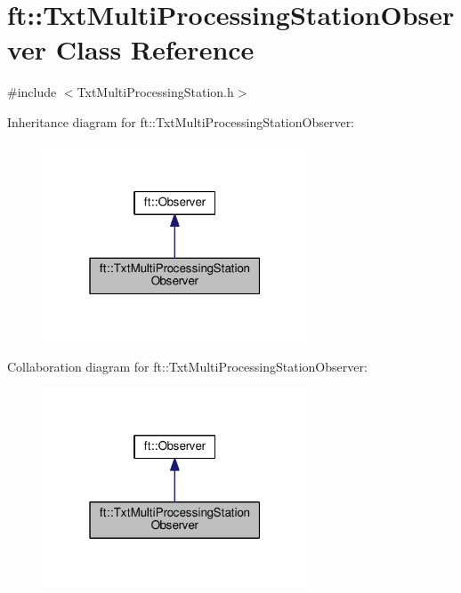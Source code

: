 \hypertarget{classft_1_1_txt_multi_processing_station_observer}{}\section{ft\+:\+:Txt\+Multi\+Processing\+Station\+Observer Class Reference}
\label{classft_1_1_txt_multi_processing_station_observer}


{\ttfamily \#include $<$Txt\+Multi\+Processing\+Station.\+h$>$}



Inheritance diagram for ft\+:\+:Txt\+Multi\+Processing\+Station\+Observer\+:
\nopagebreak
\begin{figure}[H]
\begin{center}
\leavevmode
\includegraphics[width=223pt]{classft_1_1_txt_multi_processing_station_observer__inherit__graph}
\end{center}
\end{figure}


Collaboration diagram for ft\+:\+:Txt\+Multi\+Processing\+Station\+Observer\+:
\nopagebreak
\begin{figure}[H]
\begin{center}
\leavevmode
\includegraphics[width=223pt]{classft_1_1_txt_multi_processing_station_observer__coll__graph}
\end{center}
\end{figure}
